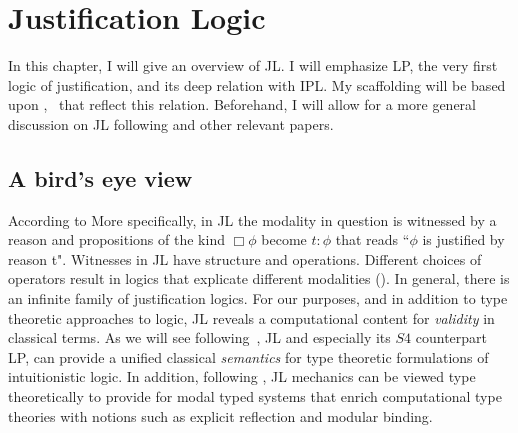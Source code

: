 \chapter{Justification Logic}\label{jllogic}
In this chapter, I will give an overview of \ac {JL}. 
I will emphasize LP, 
the very first logic of justification, and its deep relation with 
\ac{IPL}. My scaffolding will be based upon \cite{Art01BSL},~\cite{Art95TR}  
that reflect this relation. Beforehand, I will allow for a more general discussion on 
\ac{JL} following \cite{sep-logic-justification} and other 
relevant papers.


\section{A bird's eye view}
According to \cite{sep-logic-justification}
 More specifically, in \ac{JL} the modality in question is witnessed by a reason and propositions of the kind $\Box\phi$ become $t:\phi$ that reads ``$\phi$ is justified by reason t". Witnesses in \ac{JL} have structure and operations. Different choices of operators result in logics that explicate different modalities 
 ({}). 
 In general, there is an infinite family of justification logics.
 For our purposes, and in addition to type theoretic approaches to logic, \ac{JL} reveals a computational content for \emph{validity} in classical terms. As we will see following~\cite{artemov97un}, \ac{JL} and especially its {\sf $S4$} counterpart \ac{LP}, can provide a unified classical \emph{semantics} for type theoretic 
 formulations of intuitionistic logic. In addition, following \cite{Artemov2007a, DBLP:journals/entcs/PouliasisP14}, JL mechanics can be viewed type
 theoretically to provide for modal typed systems that enrich computational
 type theories with  notions such as explicit reflection and modular
 binding.
 

